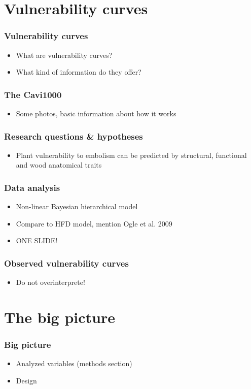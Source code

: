 \documentclass[usepdftitle=false]{beamer}
\begin{document}
\section{Vulnerability curves}
\begin{frame}
	\frametitle{Vulnerability curves}
	\begin{itemize}
		\item What are vulnerability curves?
		\item What kind of information do they offer?
	\end{itemize}  
\end{frame}

\begin{frame}
	\frametitle{The Cavi1000}
	\begin{itemize}
		\item Some photos, basic information about how it works
	\end{itemize}
\end{frame}

\begin{frame}
	\frametitle{Research questions \& hypotheses}
	\begin{itemize}
		\item Plant vulnerability to embolism can be predicted by structural, functional and wood anatomical traits
	\end{itemize}
\end{frame}

\begin{frame}
	\frametitle{Data analysis}
	\begin{itemize}
		\item Non-linear Bayesian hierarchical model
		\item Compare to HFD model, mention Ogle et al. 2009
		\item ONE SLIDE!
	\end{itemize}
\end{frame}

\begin{frame}
	\frametitle{Observed vulnerability curves}
	\begin{itemize}
		\item Do not overinterprete!
	\end{itemize}
\end{frame}

\section{The big picture}
\begin{frame}
	\frametitle{Big picture}
	\begin{itemize}
		\item Analyzed variables (methods section)
		\item Design		
	\end{itemize}
\end{frame}
\end{document}
